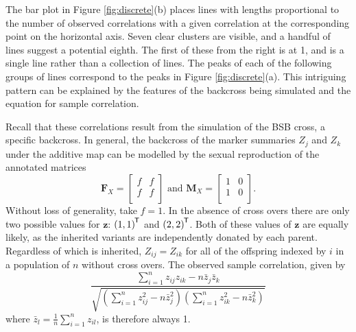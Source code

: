 \documentclass[sts]{imsart}
\newcommand{\ve}[1]{\mathbf{#1}}           %
\newcommand{\m}[1]{\mathbf{#1}}               %
\newcommand{\tr}[1]{{#1}^{\mkern-1.5mu\mathsf{T}}}              %
\begin{document}
The bar plot in Figure \ref{fig:discrete}(b) places lines with lengths proportional to the number of observed correlations with a given correlation at the corresponding point on the horizontal axis. Seven clear clusters are visible, and a handful of lines suggest a potential eighth. The first of these from the right is at 1, and is a single line rather than a collection of lines. The peaks of each of the following groups of lines correspond to the peaks in Figure \ref{fig:discrete}(a). This intriguing pattern can be explained by the features of the backcross being simulated and the equation for sample correlation.

Recall that these correlations result from the simulation of the BSB cross, a specific backcross. In general, the backcross of the marker summaries $Z_j$ and $Z_k$ under the additive map can be modelled by the sexual reproduction of the annotated matrices
$$\m{F}_X = \begin{bmatrix}
  f & f \\
  f & f \\
\end{bmatrix} \text{ and }
\m{M}_X = \begin{bmatrix}
  1 & 0 \\
  1 & 0 \\
\end{bmatrix}.$$
Without loss of generality, take $f = 1$. In the absence of cross overs there are only two possible values for $\ve{z}$: $\tr{(1,1)}$ and $\tr{(2,2)}$. Both of these values of $\ve{z}$ are equally likely, as the inherited variants are independently donated by each parent. Regardless of which is inherited, $Z_{ij} = Z_{ik}$ for all of the offspring indexed by $i$ in a population of $n$ without cross overs. The observed sample correlation, given by
\begin{equation} \label{eq:sampleCorr}
\frac{\sum_{i = 1}^n z_{ij} z_{ik} - n \bar{z}_{j} \bar{z}_{k}}{\sqrt{ \left ( \sum_{i = 1}^n z_{ij}^2 - n \bar{z}_{j}^2 \right ) \left ( \sum_{i = 1}^n z_{ik}^2 - n \bar{z}_{k}^2 \right )}}
\end{equation}
where $\bar{z}_l = \frac{1}{n} \sum_{i = 1}^n z_{il}$, is therefore always 1.
\end{document}

